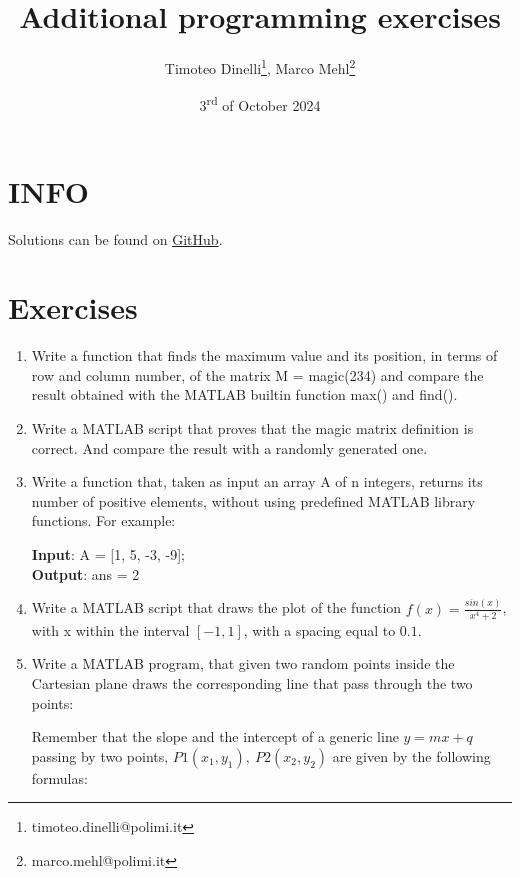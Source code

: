 \documentclass[oneside]{article}
\title{Additional programming exercises}
\author{Timoteo Dinelli\footnote{timoteo.dinelli@polimi.it}, Marco Mehl\footnote{marco.mehl@polimi.it}}
\date{3\textsuperscript{rd} of October 2024}
\begin{document}
\maketitle

\section*{INFO}
Solutions can be found on
\href{https://github.com/Titodinelli/Calcoli-di-Processo-dell-Ingegneria-Chimica}{GitHub}.

\section*{Exercises}

\begin{enumerate}
   \item Write a function that finds the maximum value and its position, in terms of row
      and column number, of the matrix M = magic(234) and compare the result obtained
      with the MATLAB builtin function max() and find().

   \item Write a MATLAB script that proves that the magic matrix definition is correct.
      And compare the result with a randomly generated one.

   \item Write a function that, taken as input an array A of n integers, returns its
      number of positive elements, without using predefined MATLAB library functions. For
      example:
      \begin{tcolorbox}[blanker, breakable, left=5mm, before skip=10pt, after skip=10pt,
         borderline west={1mm}{0pt}{bluepoli}]
         \textbf{Input}: A = [1, 5, -3, -9]; \\
         \textbf{Output}: ans = 2
      \end{tcolorbox}

   \item Write a MATLAB script that draws the plot of the function
      $f(x)=\frac{sin(x)}{x^4 + 2}$, with x within the interval $\left[-1, 1\right]$,
      with a spacing equal to $0.1$.

   \item Write a MATLAB program, that given two random points inside the Cartesian plane
      draws the corresponding line that pass through the two points:
      \begin{tcolorbox}[blanker, breakable, left=5mm, before skip=10pt, after skip=10pt,
         borderline west={1mm}{0pt}{bluepoli}]
         Remember that the slope and the intercept of a generic line $y=mx+q$ passing by
         two points, $P1(x_1, y_1),\:P2(x_2, y_2)$ are given by the following formulas:\\


\end{tcolorbox}
\end{enumerate}
\end{document}
